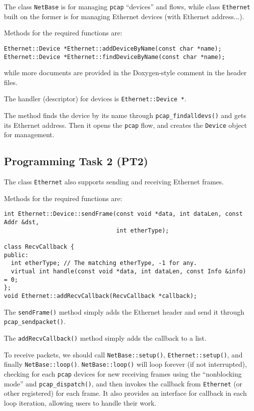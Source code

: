 \documentclass[a4paper]{article}
\begin{document}
  The class \texttt{NetBase} is for managing \texttt{pcap} ``devices'' and flows, while class \texttt{Ethernet} built on the former is for managing Ethernet devices (with Ethernet address...).

  Methods for the required functions are:
  \begin{verbatim}
Ethernet::Device *Ethernet::addDeviceByName(const char *name);
Ethernet::Device *Ethernet::findDeviceByName(const char *name);
  \end{verbatim}
  while more documents are provided in the Doxygen-style comment in the header files.

  The handler (descriptor) for devices is \texttt{Ethernet::Device *}.

  The method finds the device by its name through \texttt{pcap\_findalldevs()} and gets its Ethernet address.
  Then it opens the \texttt{pcap} flow, and creates the \texttt{Device} object for management.

  \subsection{Programming Task 2 (PT2)}

  The class \texttt{Ethernet} also supports sending and receiving Ethernet frames.

  Methods for the required functions are:
  \begin{verbatim}
int Ethernet::Device::sendFrame(const void *data, int dataLen, const Addr &dst,
                                int etherType);

class RecvCallback {
public:
  int etherType; // The matching etherType, -1 for any.
  virtual int handle(const void *data, int dataLen, const Info &info) = 0;
};
void Ethernet::addRecvCallback(RecvCallback *callback);
  \end{verbatim}

  The \texttt{sendFrame()} method simply adds the Ethernet header and send it through \texttt{pcap\_sendpacket()}.

  The \texttt{addRecvCallback()} method simply adds the callback to a list.

  To receive packets, we should call \texttt{NetBase::setup()}, \texttt{Ethernet::setup()}, and finally \texttt{NetBase::loop()}.
  \texttt{NetBase::loop()} will loop forever (if not interrupted), checking for each \texttt{pcap} devices for new receiving frames using the ``nonblocking mode'' and \texttt{pcap\_dispatch()}, and then invokes the callback from \texttt{Ethernet} (or other registered) for each frame.
  It also provides an interface for callback in each loop iteration, allowing users to handle their work.
\end{document}
